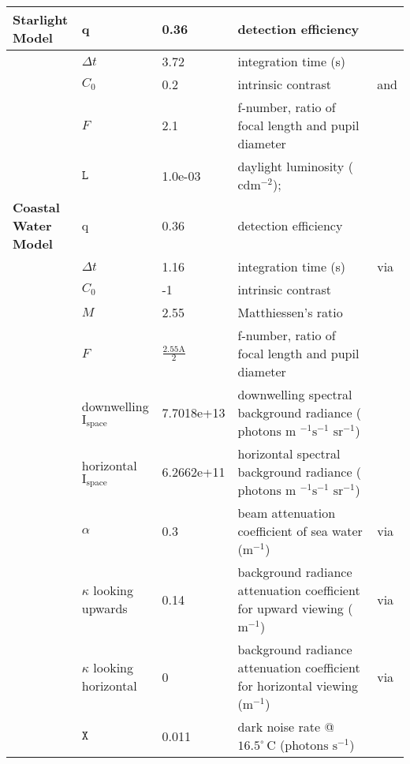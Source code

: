 \begin{tabular}{|L{3.5cm}|L{2cm}|L{2cm}|L{4.5cm}|L{4.5cm}|}
\textbf{Starlight Model}&q&0.36&detection efficiency&\cite{Nils14a}\\\hline
 &$\Delta t$&3.72&integration time (s)&\cite{Donn95a}\\\hline
 &$C_{0}$&0.2&intrinsic contrast&\cite{Hest68a} and \cite{Blac46a}\\\hline
 &$F$&2.1&f-number, ratio of focal length and pupil diameter&\cite{Mill79a}\\\hline
 &$\mathtt{L}$&1.0e-03&daylight luminosity ($\text{cd} \text{m}^{-2}$);&\cite{Midd52a}\\\hline
\textbf{Coastal Water Model}&q&0.36&detection efficiency&\cite{Nils14a}\\\hline
 &$\Delta t$&1.16&integration time (s)&\cite{Donn95a} via \cite{Nils14a}\\\hline
 &$C_{0}$&-1&intrinsic contrast&\cite{Nils14a}\\\hline
 &$M$&2.55&Matthiessen's ratio&\cite{Nils14a}\\\hline
 &$F$&$\frac{2.55\text{A}}{2}$&f-number, ratio of focal length and pupil diameter&\cite{Nils14a}\\\hline
 &downwelling $\text{I}_{\text{space}}$&7.7018e+13&downwelling spectral background radiance ($\text{photons } \text{m }^{-1} \text{s}^{-1} \text{ sr}^{-1}$)&\cite{Nils14a}\\\hline
 &horizontal $\text{I}_{\text{space}}$&6.2662e+11&horizontal spectral background radiance ($\text{photons } \text{m }^{-1} \text{s}^{-1} \text{ sr}^{-1}$)&\cite{Nils14a}\\\hline
 &$\alpha$&0.3&beam attenuation coefficient of sea water ($\text{m}^{-1}$)&\cite{John02a} via \cite{Nils14a}\\\hline
 &$\kappa$ looking upwards&0.14&background radiance attenuation coefficient for upward viewing ($\text{m}^{-1}$)&\cite{John02a} via \cite{Nils14a}\\\hline
 &$\kappa$ looking horizontal&0&background radiance attenuation coefficient for horizontal viewing ($\text{m}^{-1}$)&\cite{John02a} via \cite{Nils14a}\\\hline
 &$\mathtt{X}$&0.011&dark noise rate @$16.5^{\circ} \, \text{C}$ ($\text{photons } \text{s}^{-1}$)&\cite{Aho93a}\\\hline
\end{tabular}
